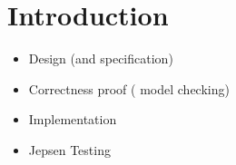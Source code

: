 
\section{Introduction} \label{section:intro}






\begin{itemize}
  \item Design (and \tlaplus{} specification)
  \item Correctness proof (\tlc{} model checking)
  \item Implementation
  \item Jepsen Testing
\end{itemize}
